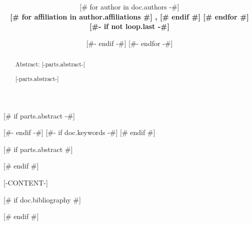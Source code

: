 \documentclass[draft, twoside, 11pt]{article}
[# else #]
\title{\bfseries\sffamily [-doc.title-]}
\date{\displaydate{articleDate}}
\author{[# for author in doc.authors -#]
\bfseries\sffamily [-author.name-]\mdseries\\
[#- if author.affiliations #]
[# for affiliation in author.affiliations #]
\sffamily [-affiliation.value.name-][# if not loop.last #], [# endif #]
[# endfor #]\\
[#- endif -#]
[#- if not loop.last -#]
\and
[#- endif -#]
[#- endfor -#]
}
\begin{document}
\maketitle

\clearpage

\tableofcontents

[# if parts.abstract -#]
\begin{abstract}
Abstract: [-parts.abstract-]
\end{abstract}
[#- endif -#]
[#- if doc.keywords -#]
[# endif #]

[# if parts.abstract #]
\begin{abstract}
[-parts.abstract-]
\end{abstract}
[# endif #]

[-CONTENT-]

[# if doc.bibliography #]

[# endif #]
\end{document}
